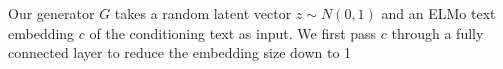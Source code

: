 Our generator $G$ takes a random latent vector $z \sim N(0, 1)$ and an ELMo text embedding $c$ of the conditioning text as input. We first pass $c$ through a fully connected layer to reduce the embedding size down to 1